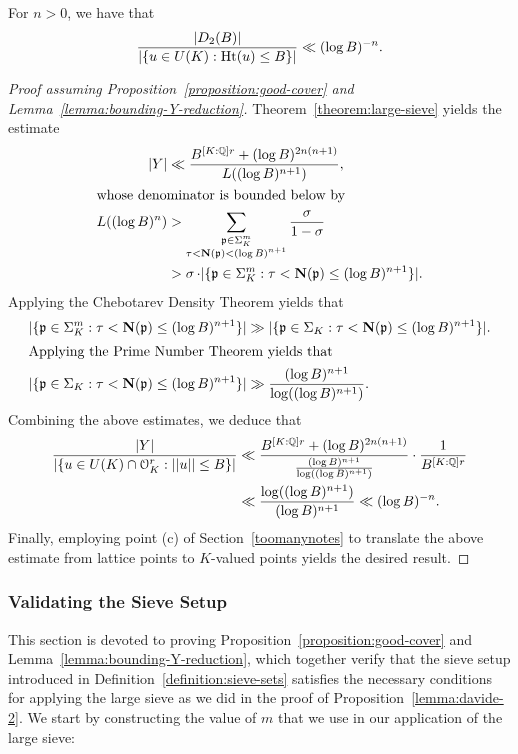 \begin{proposition}\label{lemma:davide-2}
		For $n >0$, we have that
		\[
			\frac{|D_2(B)|}{|\{u \in U(K) : \operatorname{Ht}(u) \le B\}|} \ll (\log B)^{-n}.
		\]
	\end{proposition}
	\begin{proof}[Proof assuming Proposition~\ref{proposition:good-cover} and Lemma~\ref{lemma:bounding-Y-reduction}]
Theorem~\ref{theorem:large-sieve} yields the estimate
\begin{align*}
|Y| & \ll \frac{B^{[K : {\mathbb Q}]r} + (\log B)^{2n(n+1)}}{L((\log B)^{n+1})}, \\
\intertext{whose denominator is bounded below by}
L((\log B)^n) &> \sum_{\substack{{\mathfrak{p}} \in \Sigma^m_K \\ \tau < \mathbf{N}(\mathfrak{p}) < (\log B)^{n+1}}} \frac{\operatorname{\sigma}}{1 - \operatorname{\sigma}} \\
&> \operatorname{\sigma} \cdot |\{{\mathfrak{p}} \in \Sigma^m_K : \tau < \mathbf{N}(\mathfrak{p}) \le (\log B)^{n+1} \}|.
\end{align*}
Applying the Chebotarev Density Theorem yields that
\begin{align*}
|\{{\mathfrak{p}} \in \Sigma^m_K : \tau < \mathbf{N} ({\mathfrak{p}}) \le (\log B)^{n+1} \}| &\gg |\{{\mathfrak{p}} \in \Sigma_K : \tau < \mathbf{N} ({\mathfrak{p}}) \le (\log B)^{n+1} \}|. \\
\intertext{Applying the Prime Number Theorem yields that}
|\{{\mathfrak{p}} \in \Sigma_K : \tau < \mathbf{N} ({\mathfrak{p}}) \le (\log B)^{n+1} \}|&\gg \frac{(\log B)^{n+1}}{\log ((\log B)^{n+1})}.
\end{align*}
Combining the above estimates, we deduce that
\begin{align*}
\frac{|Y|}{|\{u \in U(K) \cap \mathcal O_K^r : ||u|| \le B\}|}
& \ll \frac{B^{[K:\mathbb Q]r} + (\log B)^{2n(n+1)}}{\frac{(\log B)^{n+1}}{\log ((\log B)^{n+1})}} \cdot \frac{1}{B^{[K:\mathbb Q]r}} \\
& \ll\frac{\log (( \log B )^{n+1})}{(\log B)^{n+1}}
\ll (\log B)^{-n}.
\end{align*}
Finally, employing point (c) of Section~\ref{toomanynotes} to translate the above estimate from lattice points to $K$-valued points yields the desired result.
	\end{proof}


\subsubsection{Validating the Sieve Setup}\label{thoughtweweregoinstrong}

This section is devoted to proving Proposition~\ref{proposition:good-cover} and Lemma~\ref{lemma:bounding-Y-reduction}, which together verify that the sieve setup introduced in Definition~\ref{definition:sieve-sets} satisfies the necessary conditions for applying the large sieve as we did in the proof of Proposition~\ref{lemma:davide-2}. We start by constructing the value of $m$ that we use in our application of the large sieve:

